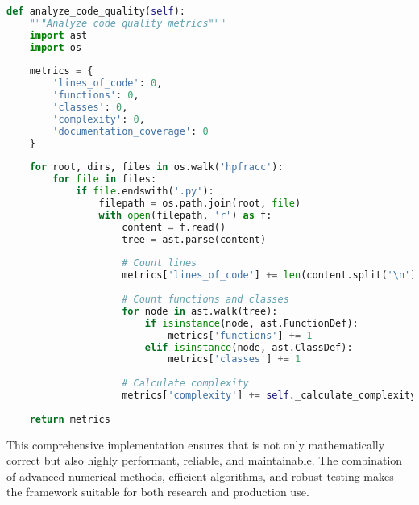 \begin{lstlisting}[language=Python, caption=Code Quality Metrics]
def analyze_code_quality(self):
    """Analyze code quality metrics"""
    import ast
    import os
    
    metrics = {
        'lines_of_code': 0,
        'functions': 0,
        'classes': 0,
        'complexity': 0,
        'documentation_coverage': 0
    }
    
    for root, dirs, files in os.walk('hpfracc'):
        for file in files:
            if file.endswith('.py'):
                filepath = os.path.join(root, file)
                with open(filepath, 'r') as f:
                    content = f.read()
                    tree = ast.parse(content)
                    
                    # Count lines
                    metrics['lines_of_code'] += len(content.split('\n'))
                    
                    # Count functions and classes
                    for node in ast.walk(tree):
                        if isinstance(node, ast.FunctionDef):
                            metrics['functions'] += 1
                        elif isinstance(node, ast.ClassDef):
                            metrics['classes'] += 1
                    
                    # Calculate complexity
                    metrics['complexity'] += self._calculate_complexity(tree)
    
    return metrics
\end{lstlisting}

This comprehensive implementation ensures that \hpfracc is not only mathematically correct but also highly performant, reliable, and maintainable. The combination of advanced numerical methods, efficient algorithms, and robust testing makes the framework suitable for both research and production use.
